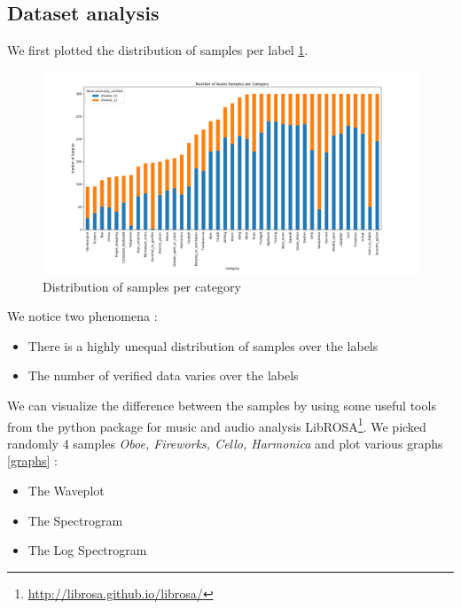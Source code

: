 \documentclass{article} %
\begin{document}
	\subsection{Dataset analysis}
		We first plotted the distribution of samples per label \ref{fig:category_distribution}.
		\begin{figure}[H]
		  \includegraphics[width=\linewidth]{category_distribution.png}
		  \caption{Distribution of samples per category}
		  \label{fig:category_distribution}
		\end{figure}
		We notice two phenomena :
		\begin{itemize}
		    \item There is a highly unequal distribution of samples over the labels
		    \item The number of verified data varies over the labels
		\end{itemize}

		We can visualize the difference between the samples by using some useful tools from the python package for music and audio analysis LibROSA\footnote{\url{http://librosa.github.io/librosa/}}. We picked randomly 4 samples \emph{Oboe, Fireworks, Cello, Harmonica} and plot various graphs \ref{graphs} :

		\begin{itemize}
		    \item The Waveplot
		    \item The Spectrogram
		    \item The Log Spectrogram
		\end{itemize}
\end{document}
